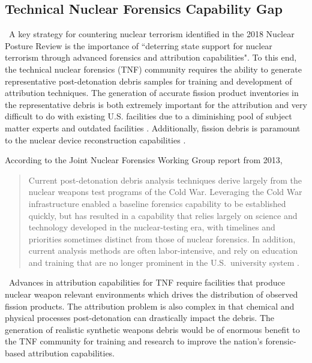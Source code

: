  
\subsection{Technical Nuclear Forensics Capability Gap}
\ A key strategy for countering nuclear terrorism identified in the 2018 Nuclear Posture Review is the importance of ``deterring state support for nuclear terrorism through advanced forensics and attribution capabilities"\cite{Defense2018}. To this end, the technical nuclear forensics (TNF) community requires the ability to generate representative post-detonation debris samples for training and development of attribution techniques.  The generation of accurate fission product inventories in the representative debris is both extremely important for the attribution and very difficult to do with existing U.S. facilities due to a diminishing pool of subject matter experts and outdated facilities \cite{NAP12966}. Additionally,  fission debris is paramount to the nuclear device reconstruction capabilities \cite{Fedchenko2015}. 

According to the Joint Nuclear Forensics Working Group report from 2013, 
\begin{quote}
	Current post-detonation debris analysis techniques derive largely from the nuclear weapons test programs of the Cold War. Leveraging the Cold War infrastructure enabled a baseline forensics capability to be established quickly, but has resulted in a capability that relies largely on science and technology developed in the nuclear-testing era, with timelines and priorities sometimes distinct from those of nuclear forensics. In addition, current analysis methods are often labor-intensive, and rely on education and training that are no longer prominent in the U.S.\ university system \cite{JNFWG}. 
\end{quote}
\ Advances in attribution capabilities for TNF require facilities that produce nuclear weapon relevant environments which drives the distribution of observed fission products. The attribution problem is also complex in that chemical and physical processes post-detonation can drastically impact the debris.  The generation of realistic synthetic weapons debris would be of enormous benefit to the TNF community for training and research to improve the nation's forensic-based attribution capabilities.

